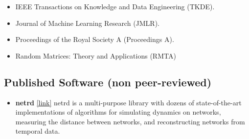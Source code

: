 \documentclass[12pt,]{scrartcl}
\newenvironment{myitemize}
{ \begin{itemize}
    \setlength{\itemsep}{5pt}
    \setlength{\parskip}{0pt}
    \setlength{\parsep}{0pt}     }
{ \end{itemize}                  }
\begin{document}
\begin{myitemize}
\leftskip-0.25in

\item IEEE Transactions on Knowledge and Data Engineering (TKDE).

\item Journal of Machine Learning Research (JMLR).

\item Proceedings of the Royal Society A (Proceedings A).

\item Random Matrices: Theory and Applications (RMTA)

\end{myitemize}


\subsection{Published Software (non peer-reviewed)}\label{software}
\begin{myitemize}
\leftskip-0.25in

\item \textbf{netrd} \href{https://github.com/netsiphd/netrd}{[link]} netrd is a multi-purpose library with dozens of state-of-the-art implementations of algorithms for simulating dynamics on networks, measuring the distance between networks, and reconstructing networks from temporal data.



\end{myitemize}
\end{document}
